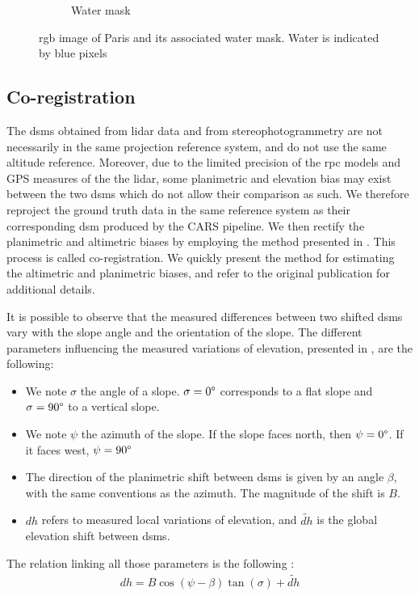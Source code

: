 \begin{figure}
\begin{subfigure}[t]{0.48\linewidth}
        \caption{Water mask}
        \label{fig:paris_watermask_2}
    \end{subfigure}
    \caption{\acrshort{rgb} image of Paris and its associated water mask. Water is indicated by blue pixels}
    \label{fig:paris_watermask}
\end{figure}

\subsection{Co-registration}
The \acrshort{dsm}s obtained from \acrshort{lidar} data and from stereophotogrammetry are not necessarily in the same projection reference system, and do not use the same altitude reference. Moreover, due to the limited precision of the \acrshort{rpc} models and GPS measures of the the \acrshort{lidar}, some planimetric and elevation bias may exist between the two \acrshort{dsm}s which do not allow their comparison as such. We therefore reproject the ground truth data in the same reference system as their corresponding \acrshort{dsm} produced by the CARS pipeline. We then rectify the planimetric and altimetric biases by employing the method presented in \cite{nuth_co-registration_2011}. This process is called co-registration. We quickly present the method for estimating the altimetric and planimetric biases, and refer to the original publication for additional details.

It is possible to observe that the measured differences between two shifted \acrshort{dsm}s vary with the slope angle and the orientation of the slope. The different parameters influencing the measured variations of elevation, presented in , are the following:
\begin{itemize}
    \item We note $\sigma$ the angle of a slope. $\sigma=0\degree$ corresponds to a flat slope and $\sigma=90\degree$ to a vertical slope.
    \item We note $\psi$ the azimuth of the slope. If the slope faces north, then $\psi=0\degree$. If it faces west, $\psi=90\degree$ \etc
    \item The direction of the planimetric shift between \acrshort{dsm}s is given by an angle $\beta$, with the same conventions as the azimuth. The magnitude of the shift is $B$.
    \item $dh$ refers to measured local variations of elevation, and $\tilde{dh}$ is the global elevation shift between \acrshort{dsm}s.
\end{itemize}
The relation linking all those parameters is the following \cite{nuth_co-registration_2011}:
\begin{align}
    dh = B\cos(\psi-\beta)\tan(\sigma)+\tilde{dh}
\end{align}

